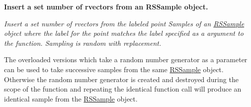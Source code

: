 \begin{Indent}{\bf \-Insert a set number of rvectors from an \-R\-S\-Sample object.}\par
{\em \-Insert a set number of rvectors from the labeled point \-Samples of an \hyperlink{classRSSample}{\-R\-S\-Sample} object where the label for the point matches the label specified as a argument to the function. \-Sampling is random with replacement.

\-The overloaded versions which take a random number generator as a parameter can be used to take successive samples from the same \hyperlink{classRSSample}{\-R\-S\-Sample} object. \-Otherwise the random number generator is created and destroyed during the scope of the function and repeating the identical function call will produce an identical sample from the \hyperlink{classRSSample}{\-R\-S\-Sample} object.


}
\end{Indent}
